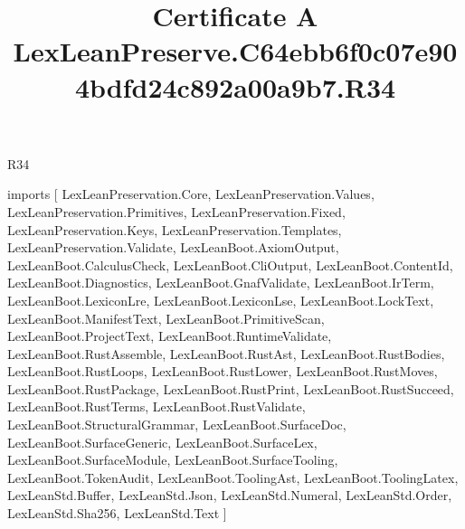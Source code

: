 \begin{lexlean}{R34}
\title{Certificate A LexLeanPreserve.C64ebb6f0c07e904bdfd24c892a00a9b7.R34}
\begin{coremodule}
imports [
  LexLeanPreservation.Core,
  LexLeanPreservation.Values,
  LexLeanPreservation.Primitives,
  LexLeanPreservation.Fixed,
  LexLeanPreservation.Keys,
  LexLeanPreservation.Templates,
  LexLeanPreservation.Validate,
  LexLeanBoot.AxiomOutput,
  LexLeanBoot.CalculusCheck,
  LexLeanBoot.CliOutput,
  LexLeanBoot.ContentId,
  LexLeanBoot.Diagnostics,
  LexLeanBoot.GnafValidate,
  LexLeanBoot.IrTerm,
  LexLeanBoot.LexiconLre,
  LexLeanBoot.LexiconLse,
  LexLeanBoot.LockText,
  LexLeanBoot.ManifestText,
  LexLeanBoot.PrimitiveScan,
  LexLeanBoot.ProjectText,
  LexLeanBoot.RuntimeValidate,
  LexLeanBoot.RustAssemble,
  LexLeanBoot.RustAst,
  LexLeanBoot.RustBodies,
  LexLeanBoot.RustLoops,
  LexLeanBoot.RustLower,
  LexLeanBoot.RustMoves,
  LexLeanBoot.RustPackage,
  LexLeanBoot.RustPrint,
  LexLeanBoot.RustSucceed,
  LexLeanBoot.RustTerms,
  LexLeanBoot.RustValidate,
  LexLeanBoot.StructuralGrammar,
  LexLeanBoot.SurfaceDoc,
  LexLeanBoot.SurfaceGeneric,
  LexLeanBoot.SurfaceLex,
  LexLeanBoot.SurfaceModule,
  LexLeanBoot.SurfaceTooling,
  LexLeanBoot.TokenAudit,
  LexLeanBoot.ToolingAst,
  LexLeanBoot.ToolingLatex,
  LexLeanStd.Buffer,
  LexLeanStd.Json,
  LexLeanStd.Numeral,
  LexLeanStd.Order,
  LexLeanStd.Sha256,
  LexLeanStd.Text
]


\end{coremodule}
\end{lexlean}
